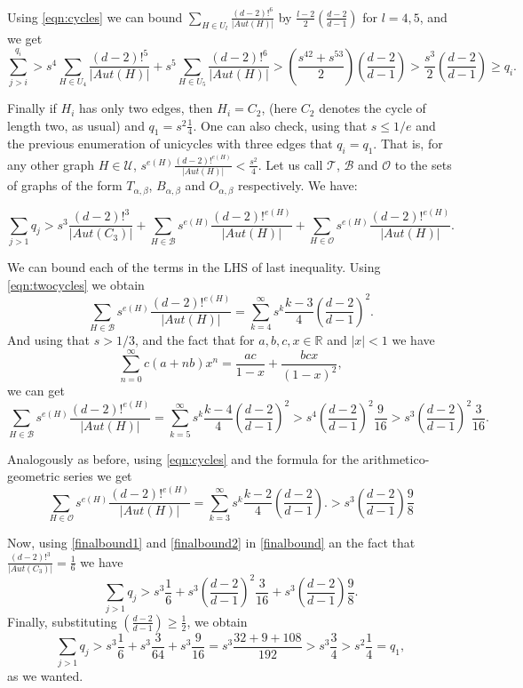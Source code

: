 \documentclass[11pt,notitlepage,a4paper]{article}
\theoremstyle{definition}
\newcommand{\R}{\mathbb{R}}
\begin{document}
Using \cref{eqn:cycles} we can bound 
$\sum_{H\in U_l}\frac{(d-2)!^6}{|Aut(H)|}$ by
$\frac{l-2}{2}\left(\frac{d-2}{d-1}\right)$ for $l=4,5$,
and we get
\[
\sum_{j>i}^{q_i}>
s^4\sum_{H\in U_4}\frac{(d-2)!^5}{|Aut(H)|}
+ s^5\sum_{H\in U_5}\frac{(d-2)!^6}{|Aut(H)|}
> \left(\frac{s^42 + s^53}{2}\right) \left( \frac{d-2}{d-1} \right)
> \frac{s^3}{2} \left( \frac{d-2}{d-1} \right)  \geq q_i.
\]
\par
Finally if $H_i$ has only two edges, then $H_i=C_2$,
(here $C_2$ denotes the cycle of length two, as usual) 
and $q_1=s^2\frac{1}{4}$. One can also check, using that
$s\leq 1/e$ and the previous enumeration of unicycles with 
three edges that $q_i=q_1$. 
That is, for any other graph $H\in \mathcal{U}$,
$s^{e(H)}\frac{(d-2)!^{e(H)}}{|Aut(H)|}<\frac{s^2}{4}$.
Let us call $\mathcal{T}$, 
$\mathcal{B}$ and $\mathcal{O}$ to the sets of graphs of the
form $T_{\alpha,\beta}$, $B_{\alpha,\beta}$
and $O_{\alpha,\beta}$ respectively. We have:

\begin{equation} \label{finalbound}
\sum_{j>1} q_j > s^{3}\frac{(d-2)!^{3}}{|Aut(C_3)|}+
\sum_{H\in \mathcal{B}} s^{e(H)}\frac{(d-2)!^{e(H)}}{|Aut(H)|} +
\sum_{H\in \mathcal{O}} s^{e(H)}\frac{(d-2)!^{e(H)}}{|Aut(H)|}.
\end{equation}

We can bound each of the terms in the LHS of last inequality.
Using \cref{eqn:twocycles} we obtain
\[ \sum_{H\in \mathcal{B}} s^{e(H)}\frac{(d-2)!^{e(H)}}{|Aut(H)|}
 =\sum_{k=4}^{\infty} s^k \frac{k-3}{4} \left(\frac{d-2}{d-1}\right)^2.
\]
And using that $s>1/3$, and the fact that for $a,b,c,x\in \R$ and
$|x|<1$ we have
\[
\sum_{n=0}^{\infty}c(a+nb)x^n = 
\frac{ac}{1-x} + \frac{bcx}{(1-x)^2},
\]  
we can get
\begin{equation} \label{finalbound1}
\sum_{H\in \mathcal{B}} s^{e(H)}\frac{(d-2)!^{e(H)}}{|Aut(H)|}=
\sum_{k=5}^{\infty} s^k \frac{k-4}{4} \left(\frac{d-2}{d-1}\right)^2
> s^4 \left(\frac{d-2}{d-1}\right)^2 \frac{9}{16} > s^3 \left(\frac{d-2}{d-1}\right)^2 \frac{3}{16}.
\end{equation}
\par
Analogously as before, using \cref{eqn:cycles} 
and the formula for the arithmetico-geometric series
we get
\begin{equation} \label{finalbound2}
\sum_{H\in \mathcal{O}} s^{e(H)}\frac{(d-2)!^{e(H)}}{|Aut(H)|}
=\sum_{k=3}^{\infty} s^k \frac{k-2}{4} \left(\frac{d-2}{d-1}\right).
> s^3 \left(\frac{d-2}{d-1}\right) \frac{9}{8}
\end{equation}
\par
Now, using  \cref{finalbound1} and \cref{finalbound2} in
\cref{finalbound} an the fact that $\frac{(d-2)!^{3}}{|Aut(C_3)|}
=\frac{1}{6}$ we have
\[
\sum_{j>1} q_j > s^{3}\frac{1}{6} +
s^3 \left(\frac{d-2}{d-1}\right)^2 \frac{3}{16} +
s^3 \left(\frac{d-2}{d-1}\right) \frac{9}{8}.
\]
Finally, substituting 
$\left(\frac{d-2}{d-1}\right)\geq \frac{1}{2}$,
we obtain
\[
\sum_{j>1} q_j > s^{3}\frac{1}{6} +
s^3 \frac{3}{64} +
s^3 \frac{9}{16} = s^3 \frac{32+9+108}{192} > s^3 \frac{3}{4}>
s^2\frac{1}{4}=q_1,
\]
as we wanted. 
\end{document}
